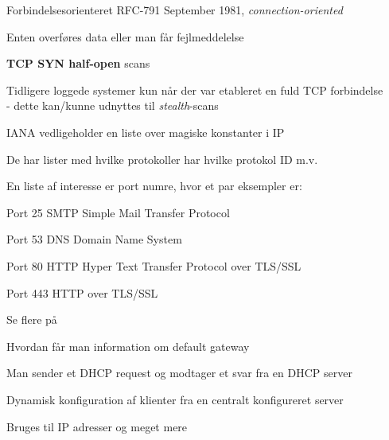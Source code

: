 \documentclass[Screen16to9,17pt]{foils}
\begin{document}

\begin{list1}
\item Forbindelsesorienteret RFC-791 September 1981, \emph{connection-oriented}
\item Enten overføres data eller man får fejlmeddelelse
\end{list1}



\begin{list2}
\item {\bfseries TCP SYN half-open} scans
\item Tidligere loggede systemer kun når der var etableret en fuld TCP
  forbindelse\\
- dette kan/kunne udnyttes til \emph{stealth}-scans
\end{list2}




\begin{list1}
\item IANA vedligeholder en liste over magiske konstanter i IP
\item De har lister med hvilke protokoller har hvilke protokol ID m.v.
\item En liste af interesse er port numre, hvor et par eksempler er:
\begin{list2}
\item Port 25 SMTP Simple Mail Transfer Protocol
\item Port 53 DNS Domain Name System
\item Port 80 HTTP Hyper Text Transfer Protocol over TLS/SSL
\item Port 443 HTTP over TLS/SSL
\end{list2}
\item Se flere på 
\end{list1}




\begin{list1}
\item Hvordan får man information om default gateway
\item Man sender et DHCP request og modtager et svar fra en DHCP server
\item Dynamisk konfiguration af klienter fra en centralt konfigureret server
\item Bruges til IP adresser og meget mere
\end{list1}
\end{document}
